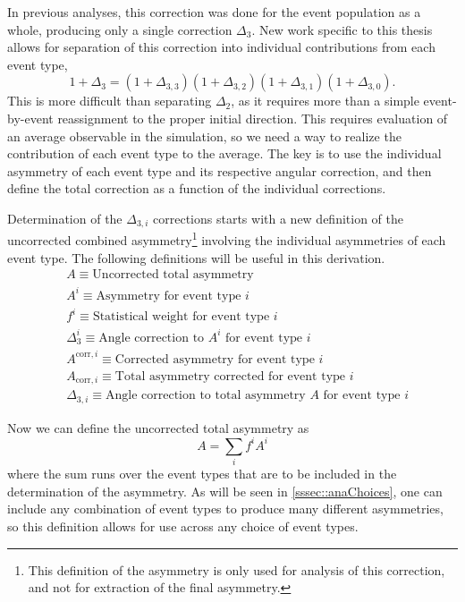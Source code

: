In previous analyses, this correction was done for the event population as a whole, producing
only a single correction $\Delta_3$. New work specific to this thesis allows for
separation of this correction into individual contributions from each event type,
%
\begin{equation}
1+\Delta_{3} = (1+\Delta_{3,3})(1+\Delta_{3,2})(1+\Delta_{3,1})(1+\Delta_{3,0}).
\end{equation}
%
\noindent This is more difficult than separating $\Delta_2$, as it requires more than a simple
event-by-event reassignment to the proper initial direction. This requires evaluation of
an average observable in the simulation, so we need a way to realize the contribution
of each event type to the average. The key is to use the individual asymmetry of each event
type and its respective angular correction, and then define the total correction as a function
of the individual corrections. 

Determination of the $\Delta_{3,i}$ corrections starts with a new definition of the
uncorrected combined asymmetry\footnote{\label{fnote:newAsymmDef}This definition
of the asymmetry is only used for analysis of this correction, and not for extraction
of the final asymmetry.} involving the individual asymmetries of each event type.
The following definitions will be useful in this derivation.
%
\begin{align*}
  &A \equiv \textrm{Uncorrected total asymmetry}\\
  &A^i \equiv \textrm{Asymmetry for event type } i\\
  &f^i \equiv \textrm{Statistical weight for event type }i\\
  &\Delta^i_3 \equiv \textrm{Angle correction to }A^i\textrm{ for event type }i\\
  &A^{\mathrm{corr},i} \equiv \textrm{Corrected asymmetry for event type } i\\
  &A_{\mathrm{corr},i} \equiv \textrm{Total asymmetry corrected for event type } i\\
  &\Delta_{3,i} \equiv \textrm{Angle correction to total asymmetry }A
  \textrm{ for event type }i
\end{align*}
%

Now we can define the uncorrected total asymmetry as
%
\begin{equation}
A=\sum_i f^iA^i
\end{equation}
%
\noindent where the sum runs over the event types that are to be included in the
determination of the asymmetry. As will be seen in \ref{sssec::anaChoices}, one can include
any combination of event types to produce many different asymmetries, so this definition
allows for use across any choice of event types.

